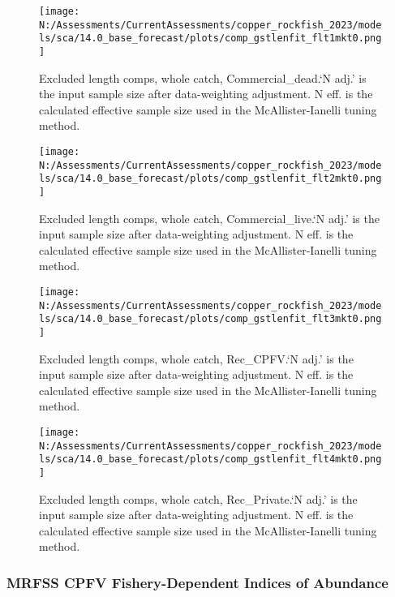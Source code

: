 \documentclass[11pt,
  english,
  letterpaper,
]{article}
\begin{document}
\begin{figure}
\centering
\texttt{[image: N:/Assessments/CurrentAssessments/copper\_rockfish\_2023/models/sca/14.0\_base\_forecast/plots/comp\_gstlenfit\_flt1mkt0.png]}
\caption{Excluded length comps, whole catch, Commercial\_dead.`N adj.' is the input sample size after data-weighting adjustment. N eff. is the calculated effective sample size used in the McAllister-Ianelli tuning method.\label{fig:comp_gstlenfit_flt1mkt0}}
\end{figure}

\begin{figure}
\centering
\texttt{[image: N:/Assessments/CurrentAssessments/copper\_rockfish\_2023/models/sca/14.0\_base\_forecast/plots/comp\_gstlenfit\_flt2mkt0.png]}
\caption{Excluded length comps, whole catch, Commercial\_live.`N adj.' is the input sample size after data-weighting adjustment. N eff. is the calculated effective sample size used in the McAllister-Ianelli tuning method.\label{fig:comp_gstlenfit_flt2mkt0}}
\end{figure}

\begin{figure}
\centering
\texttt{[image: N:/Assessments/CurrentAssessments/copper\_rockfish\_2023/models/sca/14.0\_base\_forecast/plots/comp\_gstlenfit\_flt3mkt0.png]}
\caption{Excluded length comps, whole catch, Rec\_CPFV.`N adj.' is the input sample size after data-weighting adjustment. N eff. is the calculated effective sample size used in the McAllister-Ianelli tuning method.\label{fig:comp_gstlenfit_flt3mkt0}}
\end{figure}

\begin{figure}
\centering
\texttt{[image: N:/Assessments/CurrentAssessments/copper\_rockfish\_2023/models/sca/14.0\_base\_forecast/plots/comp\_gstlenfit\_flt4mkt0.png]}
\caption{Excluded length comps, whole catch, Rec\_Private.`N adj.' is the input sample size after data-weighting adjustment. N eff. is the calculated effective sample size used in the McAllister-Ianelli tuning method.\label{fig:comp_gstlenfit_flt4mkt0}}
\end{figure}

\pagebreak

\hypertarget{mrfss-cpfv-fishery-dependent-indices-of-abundance}{%
\subsubsection{MRFSS CPFV Fishery-Dependent Indices of Abundance}\label{mrfss-cpfv-fishery-dependent-indices-of-abundance}}
\end{document}
